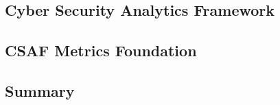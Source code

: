 


\subsection{Cyber Security Analytics Framework}\label{sec:background:pipelines:csaf}



\subsection{CSAF Metrics Foundation}\label{sec:background:pipelines:graph_based_metrics}








\subsection{Summary}\label{sec:background:pipelines:csaf_summary}


